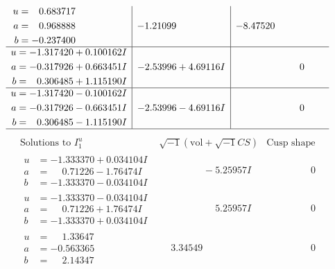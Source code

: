\documentclass[1p]{elsarticle_modified}
\theoremstyle{definition}
\newcommand{\I}{\sqrt{-1}}
\begin{document}
$$\begin{array}{c|c|c}
\begin{aligned}
u &= \phantom{-}0.683717\phantom{ +0.000000I} \\
a &= \phantom{-}0.968888\phantom{ +0.000000I} \\
b &= -0.237400\phantom{ +0.000000I}\end{aligned}
 & -1.21099\phantom{ +0.000000I} & -8.47520\phantom{ +0.000000I} \\ \hline\begin{aligned}
u &= -1.317420 + 0.100162 I \\
a &= -0.317926 + 0.663451 I \\
b &= \phantom{-}0.306485 + 1.115190 I\end{aligned}
 & -2.53996 + 4.69116 I & \phantom{-0.000000 } 0 \\ \hline\begin{aligned}
u &= -1.317420 - 0.100162 I \\
a &= -0.317926 - 0.663451 I \\
b &= \phantom{-}0.306485 - 1.115190 I\end{aligned}
 & -2.53996 - 4.69116 I & \phantom{-0.000000 } 0\\
 \hline 
 \end{array}$$\newpage$$\begin{array}{c|c|c}  
\text{Solutions to }I^u_{1}& \I (\text{vol} + \sqrt{-1}CS) & \text{Cusp shape}\\
 \hline 
\begin{aligned}
u &= -1.333370 + 0.034104 I \\
a &= \phantom{-}0.71226 - 1.76474 I \\
b &= -1.333370 - 0.034104 I\end{aligned}
 & \phantom{-0.000000 } -5.25957 I & \phantom{-0.000000 } 0 \\ \hline\begin{aligned}
u &= -1.333370 - 0.034104 I \\
a &= \phantom{-}0.71226 + 1.76474 I \\
b &= -1.333370 + 0.034104 I\end{aligned}
 & \phantom{-0.000000 -}5.25957 I & \phantom{-0.000000 } 0 \\ \hline\begin{aligned}
u &= \phantom{-}1.33647\phantom{ +0.000000I} \\
a &= -0.563365\phantom{ +0.000000I} \\
b &= \phantom{-}2.14347\phantom{ +0.000000I}\end{aligned}
 & \phantom{-}3.34549\phantom{ +0.000000I} & \phantom{-0.000000 } 0 \\ \hline\begin{aligned}

\end{aligned}
\end{array}$$
\end{document}
